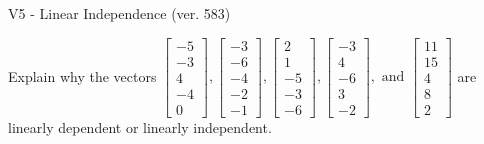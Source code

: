 \begin{exercise}
  \begin{exerciseTitle}V5 - Linear Independence (ver. 583)\end{exerciseTitle}
  \begin{exerciseStatement}
    Explain why the vectors \(\left[\begin{array}{r}
-5 \\
-3 \\
4 \\
-4 \\
0
\end{array}\right] , \left[\begin{array}{r}
-3 \\
-6 \\
-4 \\
-2 \\
-1
\end{array}\right] , \left[\begin{array}{r}
2 \\
1 \\
-5 \\
-3 \\
-6
\end{array}\right] , \left[\begin{array}{r}
-3 \\
4 \\
-6 \\
3 \\
-2
\end{array}\right] , \text{ and } \left[\begin{array}{r}
11 \\
15 \\
4 \\
8 \\
2
\end{array}\right]\) are linearly dependent or linearly independent.	



\end{exerciseStatement}
\end{exercise}
